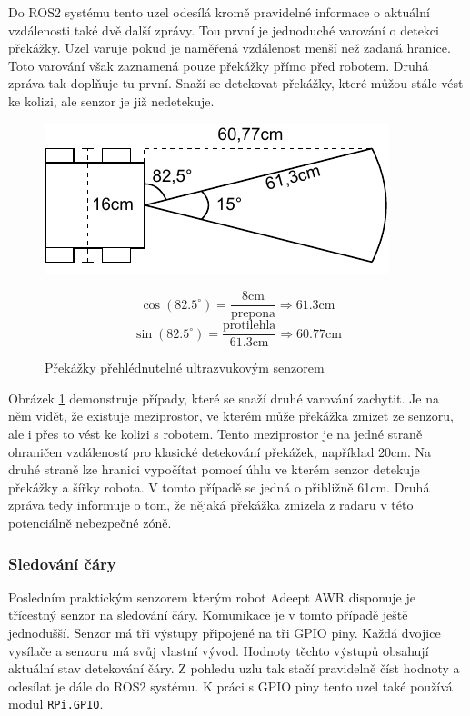 Do ROS2 systému tento uzel odesílá kromě pravidelné informace o aktuální vzdálenosti také dvě další zprávy. Tou první je jednoduché varování o detekci překážky. Uzel varuje pokud je naměřená vzdálenost menší než zadaná hranice. Toto varování však zaznamená pouze překážky přímo před robotem. Druhá zpráva tak doplňuje tu první. Snaží se detekovat překážky, které můžou stále vést ke kolizi, ale senzor je již nedetekuje. 

\begin{figure}[h!]
	\centering
	\begin{minipage}[c]{0.5\textwidth}
		\centering
		\includegraphics[scale=1.0]{obrazky-figures/ultrasonic_blind_spot.pdf}
	\end{minipage}%
	\begin{minipage}[c]{0.5\textwidth}
			$$\cos(82.5^\circ) = \frac{8\text{cm}}{\text{prepona}} \Rightarrow 61.3\text{cm}$$
			$$\sin(82.5^\circ) = \frac{\text{protilehla}}{61.3\text{cm}} \Rightarrow 60.77\text{cm}$$
	\end{minipage}
	\caption{Překážky přehlédnutelné ultrazvukovým senzorem}
	\label{fig:ultrasonic_blind_spot}
\end{figure}

Obrázek \ref{fig:ultrasonic_blind_spot} demonstruje případy, které se snaží druhé varování zachytit. Je na něm vidět, že existuje meziprostor, ve kterém může překážka zmizet ze senzoru, ale i přes to vést ke kolizi s robotem. Tento meziprostor je na jedné straně ohraničen vzdáleností pro klasické detekování překážek, například 20cm. Na druhé straně lze hranici vypočítat pomocí úhlu ve kterém senzor detekuje překážky a šířky robota.
V tomto případě se jedná o přibližně 61cm. Druhá zpráva tedy informuje o tom, že nějaká překážka zmizela z radaru v této potenciálně nebezpečné zóně.

\subsubsection*{Sledování čáry}
Posledním praktickým senzorem kterým robot Adeept AWR disponuje je třícestný senzor na sledování čáry.
Komunikace je v tomto případě ještě jednodušší. Senzor má tři výstupy připojené na tři GPIO piny. Každá dvojice vysílače a senzoru má svůj vlastní vývod. Hodnoty těchto výstupů obsahují aktuální stav detekování čáry. Z pohledu uzlu tak stačí pravidelně číst hodnoty a odesílat je dále do ROS2 systému. K práci s GPIO piny tento uzel také používá modul \verb|RPi.GPIO|.

